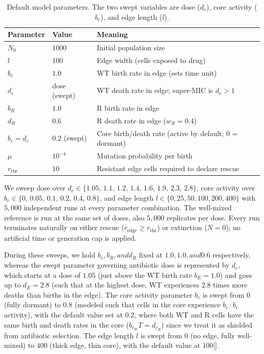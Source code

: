 \documentclass[11pt]{article}
\newcommand{\Nzero}{N_0}
\newcommand{\bEdge}{b_e}
\newcommand{\dEdge}{d_e}
\newcommand{\bCore}{b_c}
\newcommand{\dCore}{d_c}
\newcommand{\bR}{b_R}
\newcommand{\dR}{d_R}
\newcommand{\wR}{w_R}
\begin{document}
\begin{table}[htbp]
\centering
\small
\begin{tabular}{lll}
\toprule
Parameter & Value & Meaning \\
\midrule
$\Nzero$         & $1000$        & Initial population size \\
$l$              & $100$         & Edge width (cells exposed to drug) \\
$\bEdge$         & $1.0$         & WT birth rate in edge (sets time unit) \\
$\dEdge$         & dose (swept)  & WT death rate in edge; super-MIC is $\dEdge > 1$ \\
$\bR$            & $1.0$         & R birth rate in edge \\
$\dR$            & $0.6$         & R death rate in edge ($\wR = 0.4$) \\
$\bCore = \dCore$ & $0.2$ (swept) & Core birth/death rate (active by default; $0$ = dormant) \\
$\mu$            & $10^{-4}$     & Mutation probability per birth \\
$r_{\text{thr}}$ & $10$          & Resistant edge cells required to declare rescue \\
\bottomrule
\end{tabular}
\caption{Default model parameters. The two swept variables are dose
($\dEdge$), core activity ($\bCore$), and edge length ($l$).}
\end{table}

We sweep dose over $\dEdge \in \{1.05,\,1.1,\,1.2,\,1.4,\,1.6,\,1.9,\,2.3,\,2.8\}$, core activity over $\bCore \in \{0,\,0.05,\,0.1,\,0.2,\,0.4,\,0.8\}$, and edge length $l \in \{0, 25, 50, 100, 200, 400\}$ with $5{,}000$ independent runs at every parameter combination. The well-mixed reference is run at the same set of doses, also $5{,}000$ replicates per dose. Every run terminates naturally on either rescue ($r_{\text{edge}} \geq r_{\text{thr}}$) or extinction ($N = 0$); no artificial time or generation cap is applied. 

During these sweeps, we hold $b_e, b_R, and d_R$ fixed at $1.0, 1.0, and 0.6$ respectively, whereas the swept parameter governing antibiotic dose is represented by $d_e$, which starts at a dose of $1.05$ (just above the WT birth rate $b_E = 1.0$) and goes up to $d_E = 2.8$ (such that at the highest dose, WT experiences 2.8 times more deaths than births in the edge). The core activity parameter $b_c$ is swept from $0$ (fully dormant) to $0.8$ (modeled such that cells in the core experience $b_c \cdot b_e$ activity), with the default value set at $0.2$, where both WT and R cells have the same birth and death rates in the core ($\bCore_WT = \dCore_R$) since we treat it as shielded from antibiotic selection. The edge length $l$ is swept from $0$ (no edge, fully well-mixed) to $400$ (thick edge, thin core), with the default value at $100$[].
\end{document}
